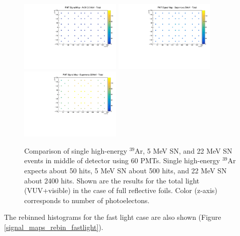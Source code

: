 \documentclass[a4paper]{article}
\begin{document}
\begin{figure}[H]
\center
\includegraphics[width=0.43\textwidth]{ar39_signal_map_rebin.pdf}
\includegraphics[width=0.43\textwidth]{sn_signal_map_rebin.pdf}
\includegraphics[width=0.43\textwidth]{sn_signal_map_higherE_rebin.pdf}
\caption{Comparison of single high-energy $^{39}$Ar, 5 MeV SN, and 22 MeV SN events in middle of detector using 60 PMTs. Single high-energy $^{39}$Ar expects about 50 hits, 5 MeV SN about 500 hits, and 22 MeV SN about 2400 hits. Shown are the results for the total light (VUV+visible) in the case of full reflective foils. Color (z-axis) corresponds to number of photoelectons.}\label{signal_maps_rebin}
\end{figure}

The rebinned histograms for the fast light case are also shown (Figure \ref{signal_maps_rebin_fastlight}).
\end{document}

